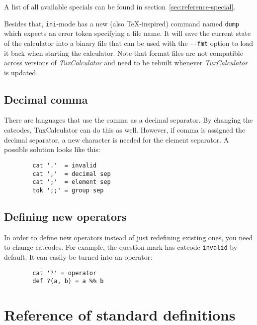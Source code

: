 \documentclass[10pt]{article}
\begin{document}
    A list of all available specials can be found in section~\ref{sec:reference-special}.
    
    Besides that, \verb|ini|-mode has a new (also \TeX-inspired) command named \verb|dump| which expects an error token specifying a file name.
    It will save the current state of the calculator into a binary file that can be used with the \verb|--fmt| option to load it back when starting the calculator.
    Note that format files are not compatible across versions of \textit{TuxCalculator} and need to be rebuilt whenever \textit{TuxCalculator} is updated.
    
    \subsection{Decimal comma}\label{subsec:decimal-comma}
    There are languages that use the comma as a decimal separator.
    By changing the catcodes, TuxCalculator can do this as well.
    However, if comma is assigned the decimal separator, a new character is needed for the element separator.
    A possible solution looks like this:
    \begin{verbatim}
        cat '.'  = invalid
        cat ','  = decimal sep
        cat ';'  = element sep
        tok ';;' = group sep
    \end{verbatim}
    
    \subsection{Defining new operators}\label{subsec:new-operators}
    In order to define new operators instead of just redefining existing ones, you need to change catcodes.
    For example, the question mark has catcode \verb|invalid| by default.
    It can easily be turned into an operator:
    \begin{verbatim}
        cat '?' = operator
        def ?(a, b) = a %% b
    \end{verbatim}

    \section{Reference of standard definitions}\label{sec:reference-def}
\end{document}
